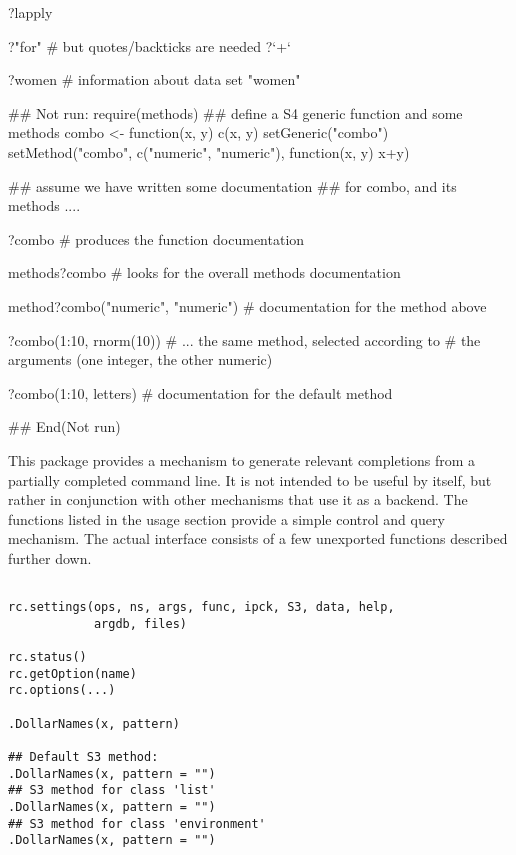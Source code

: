 \begin{Examples}
\begin{ExampleCode}
?lapply

?"for"                  # but quotes/backticks are needed
?`+`

?women                  # information about data set "women"

## Not run: 
require(methods)
## define a S4 generic function and some methods
combo <- function(x, y) c(x, y)
setGeneric("combo")
setMethod("combo", c("numeric", "numeric"), function(x, y) x+y)

## assume we have written some documentation
## for combo, and its methods ....

?combo  # produces the function documentation

methods?combo  # looks for the overall methods documentation

method?combo("numeric", "numeric")  # documentation for the method above

?combo(1:10, rnorm(10))  # ... the same method, selected according to
                         # the arguments (one integer, the other numeric)

?combo(1:10, letters)    # documentation for the default method

## End(Not run)
\end{ExampleCode}
\end{Examples}
%
\begin{Description}\relax
This package provides a mechanism to generate relevant completions
from a partially completed command line.  It is not intended to be
useful by itself, but rather in conjunction with other mechanisms that
use it as a backend.  The functions listed in the usage section
provide a simple control and query mechanism.  The actual interface
consists of a few unexported functions described further down.
\end{Description}
%
\begin{Usage}
\begin{verbatim}

rc.settings(ops, ns, args, func, ipck, S3, data, help,
            argdb, files)

rc.status()
rc.getOption(name)
rc.options(...)

.DollarNames(x, pattern)

## Default S3 method:
.DollarNames(x, pattern = "")
## S3 method for class 'list'
.DollarNames(x, pattern = "")
## S3 method for class 'environment'
.DollarNames(x, pattern = "")

\end{verbatim}
\end{Usage}
